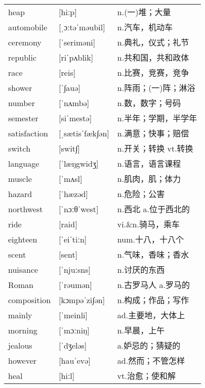 \documentclass[a4paper]{article}
\begin{document}
\section{}
\begin{tabular}{l l l}

heap & [hiːp] & n.(一)堆；大量 \\
automobile & [ˌɔːtəˈməubil] & n.汽车，机动车 \\
ceremony & [ˈseriməni] & n.典礼，仪式；礼节 \\
republic & [riˈpʌblik] & n.共和国，共和政体 \\
race & [reis] & n.比赛，竞赛，竞争 \\
shower & [ˈ∫auə] & n.阵雨；(一)阵；淋浴 \\
number & [ˈnʌmbə] & n.数，数字；号码 \\
semester & [siˈmestə] & n.半年；学期，半学年 \\
satisfaction & [ˌsætisˈfæk∫ən] & n.满意；快事；赔偿 \\
switch & [swit∫] & n.开关；转换 vt.转换 \\
language & [ˈlæŋgwidʒ] & n.语言，语言课程 \\
muscle & [ˈmʌsl] & n.肌肉，肌；体力 \\
hazard & [ˈhæzəd] & n.危险；公害 \\
northwest & [ˈnɔːθˈwest] & n.西北 a.位于西北的 \\
ride & [raid] & vi.\&n.骑马，乘车 \\
eighteen & [ˈeiˈtiːn] & num.十八，十八个 \\
scent & [sent] & n.气味，香味；香水 \\
nuisance & [ˈnjuːsns] & n.讨厌的东西 \\
Roman & [ˈrəumən] & n.古罗马人 a.罗马的 \\
composition & [kɔmpəˈzi∫ən] & n.构成；作品；写作 \\
mainly & [ˈmeinli] & ad.主要地，大体上 \\
morning & [ˈmɔːniŋ] & n.早晨，上午 \\
jealous & [ˈdʒeləs] & a.妒忌的；猜疑的 \\
however & [hauˈevə] & ad.然而；不管怎样 \\
heal & [hiːl] & vt.治愈；使和解 \\

\end{tabular}
\end{document}
